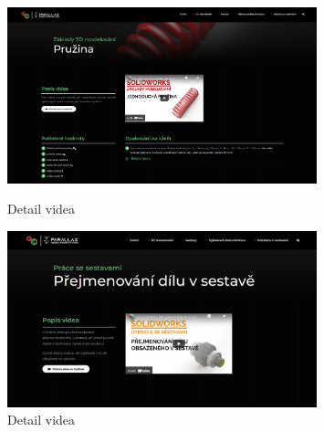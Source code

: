 \begin{figure}[htbp]
    \centering
    \begin{minipage}[b]{0.45\textwidth}
        \centering
        \includegraphics[width=0.8\textwidth]{img/020/web/web-3D.png}
        \caption{Detail videa}
        \label{fig:p3dportal-3D}
    \end{minipage}
    \qquad
    \begin{minipage}[b]{0.45\textwidth}
        \centering
        \includegraphics[width=0.8\textwidth]{img/020/web/web-assembly.png}
        \caption{Detail videa}
        \label{fig:p3dportal-assembly}
    \end{minipage}
\end{figure}